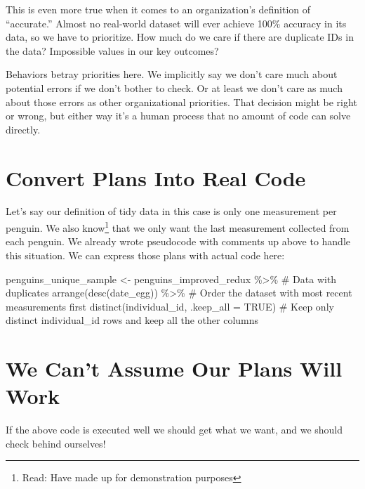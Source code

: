 \documentclass[
  letterpaper,
  DIV=11,
  numbers=noendperiod]{scrreprt}
\newenvironment{Shaded}{\begin{snugshade}}{\end{snugshade}}
\newcommand{\AttributeTok}[1]{\textcolor[rgb]{0.40,0.45,0.13}{#1}}
\newcommand{\CommentTok}[1]{\textcolor[rgb]{0.37,0.37,0.37}{#1}}
\newcommand{\ConstantTok}[1]{\textcolor[rgb]{0.56,0.35,0.01}{#1}}
\newcommand{\FunctionTok}[1]{\textcolor[rgb]{0.28,0.35,0.67}{#1}}
\newcommand{\NormalTok}[1]{\textcolor[rgb]{0.00,0.23,0.31}{#1}}
\newcommand{\OtherTok}[1]{\textcolor[rgb]{0.00,0.23,0.31}{#1}}
\newcommand{\SpecialCharTok}[1]{\textcolor[rgb]{0.37,0.37,0.37}{#1}}
\begin{document}
This is even more true when it comes to an organization's definition of
``accurate.'' Almost no real-world dataset will ever achieve 100\%
accuracy in its data, so we have to prioritize. How much do we care if
there are duplicate IDs in the data? Impossible values in our key
outcomes?

Behaviors betray priorities here. We implicitly say we don't care much
about potential errors if we don't bother to check. Or at least we don't
care as much about those errors as other organizational priorities. That
decision might be right or wrong, but either way it's a human process
that no amount of code can solve directly.

\hypertarget{convert-plans-into-real-code}{%
\section{Convert Plans Into Real
Code}\label{convert-plans-into-real-code}}

Let's say our definition of tidy data in this case is only one
measurement per penguin. We also know\footnote{Read: Have made up for
  demonstration purposes} that we only want the last measurement
collected from each penguin. We already wrote pseudocode with comments
up above to handle this situation. We can express those plans with
actual code here:

\begin{Shaded}
\begin{Highlighting}[]
\NormalTok{penguins\_unique\_sample }\OtherTok{\textless{}{-}}\NormalTok{ penguins\_improved\_redux }\SpecialCharTok{\%\textgreater{}\%} \CommentTok{\# Data with duplicates}
  \FunctionTok{arrange}\NormalTok{(}\FunctionTok{desc}\NormalTok{(date\_egg)) }\SpecialCharTok{\%\textgreater{}\%} \CommentTok{\# Order the dataset with most recent measurements first}
  \FunctionTok{distinct}\NormalTok{(individual\_id, }\AttributeTok{.keep\_all =} \ConstantTok{TRUE}\NormalTok{) }\CommentTok{\# Keep only distinct individual\_id rows and keep all the other columns}
\end{Highlighting}
\end{Shaded}

\hypertarget{we-cant-assume-our-plans-will-work}{%
\section{We Can't Assume Our Plans Will
Work}\label{we-cant-assume-our-plans-will-work}}

If the above code is executed well we should get what we want, and we
should check behind ourselves!
\end{document}
